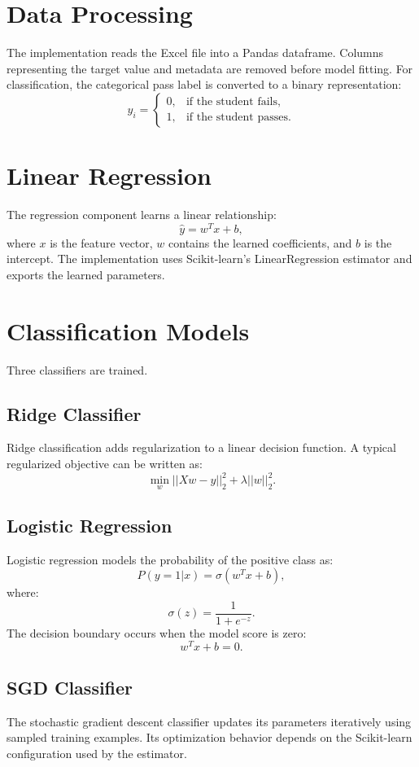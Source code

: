\documentclass[11pt]{article}
\begin{document}
\section{Data Processing}
The implementation reads the Excel file into a Pandas dataframe. Columns representing
the target value and metadata are removed before model fitting. For classification, the
categorical pass label is converted to a binary representation:
\[
y_i =
\begin{cases}
0,&\text{if the student fails},\\
1,&\text{if the student passes}.
\end{cases}
\]

\section{Linear Regression}
The regression component learns a linear relationship:
\[
\hat{y}=w^Tx+b,
\]
where $x$ is the feature vector, $w$ contains the learned coefficients, and $b$ is the
intercept. The implementation uses Scikit-learn's LinearRegression estimator and exports
the learned parameters.

\section{Classification Models}
Three classifiers are trained.

\subsection{Ridge Classifier}
Ridge classification adds regularization to a linear decision function. A typical
regularized objective can be written as:
\[
\min_w ||Xw-y||^2_2+\lambda||w||^2_2.
\]

\subsection{Logistic Regression}
Logistic regression models the probability of the positive class as:
\[
P(y=1|x)=\sigma(w^Tx+b),
\]
where:
\[
\sigma(z)=\frac{1}{1+e^{-z}}.
\]
The decision boundary occurs when the model score is zero:
\[
w^Tx+b=0.
\]

\subsection{SGD Classifier}
The stochastic gradient descent classifier updates its parameters iteratively using
sampled training examples. Its optimization behavior depends on the Scikit-learn
configuration used by the estimator.
\end{document}
